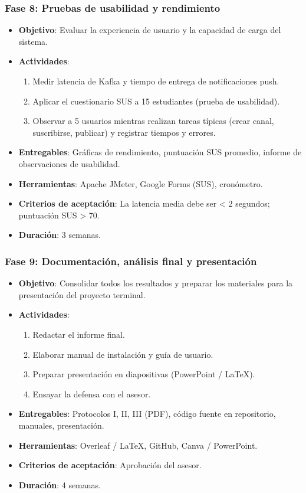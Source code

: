 \subsubsection{Fase 8: Pruebas de usabilidad y rendimiento}
\begin{itemize}
    \item \textbf{Objetivo}: Evaluar la experiencia de usuario y la capacidad de carga del sistema.
    \item \textbf{Actividades}:
        \begin{enumerate}
            \item Medir latencia de Kafka y tiempo de entrega de notificaciones push.
            \item Aplicar el cuestionario SUS a 15 estudiantes (prueba de usabilidad).
            \item Observar a 5 usuarios mientras realizan tareas típicas (crear canal, suscribirse, publicar) y registrar tiempos y errores.
        \end{enumerate}
    \item \textbf{Entregables}: Gráficas de rendimiento, puntuación SUS promedio, informe de observaciones de usabilidad.
    \item \textbf{Herramientas}: Apache JMeter, Google Forms (SUS), cronómetro.
    \item \textbf{Criterios de aceptación}: La latencia media debe ser < 2 segundos; puntuación SUS > 70.
    \item \textbf{Duración}: 3 semanas.
\end{itemize}

\subsubsection{Fase 9: Documentación, análisis final y presentación}
\begin{itemize}
    \item \textbf{Objetivo}: Consolidar todos los resultados y preparar los materiales para la presentación del proyecto terminal.
    \item \textbf{Actividades}:
        \begin{enumerate}
            \item Redactar el informe final.
            \item Elaborar manual de instalación y guía de usuario.
            \item Preparar presentación en diapositivas (PowerPoint / LaTeX).
            \item Ensayar la defensa con el asesor.
        \end{enumerate}
    \item \textbf{Entregables}: Protocolos I, II, III (PDF), código fuente en repositorio, manuales, presentación.
    \item \textbf{Herramientas}: Overleaf / LaTeX, GitHub, Canva / PowerPoint.
    \item \textbf{Criterios de aceptación}: Aprobación del asesor.
    \item \textbf{Duración}: 4 semanas.
\end{itemize}

